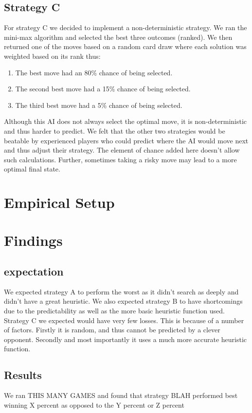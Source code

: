 \documentclass[12pt]{article}
\begin{document}
\subsection{Strategy C}
For strategy C we decided to implement a non-deterministic strategy. We ran the mini-max algorithm and selected the best three outcomes (ranked). We then returned one of the moves based on a random card draw where each solution was weighted based on its rank thus:
\begin{enumerate}
\item The best move had an 80\% chance of being selected.
\item The second best move had a 15\% chance of being selected.
\item The third best move had a 5\% chance of being selected.
\end{enumerate}
Although this AI does not always select the optimal move, it is non-deterministic and thus harder to predict. We felt that the other two strategies would be beatable by experienced players who could predict where the AI would move next and thus adjust their strategy. The element of chance added here doesn't allow such calculations. Further, sometimes taking a risky move may lead to a more optimal final state.

\section{Empirical Setup}

\section{Findings}
\subsection{expectation}
We expected strategy A to perform the worst as it didn't search as deeply and didn't have a great heuristic. We also expected strategy B to have shortcomings due to the predictability as well as the more basic heuristic function used. Strategy C we expected would have very few losses. This is because of a number of factors. Firstly it is random, and thus cannot be predicted by a clever opponent. Secondly and most importantly it uses a much more accurate heuristic function.
\subsection{Results}
We ran THIS MANY GAMES and found that strategy BLAH performed best winning X percent as opposed to the Y percent or Z percent
\end{document}
